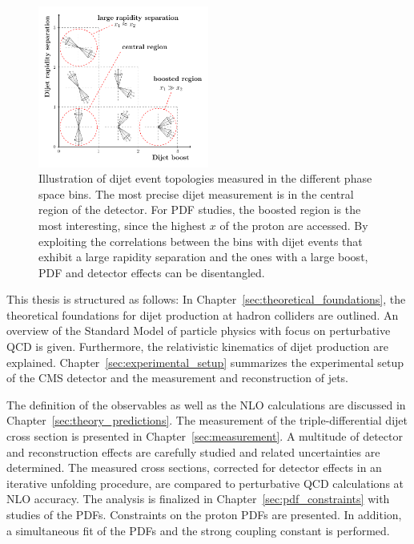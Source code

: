 \begin{figure}
    \centering
    \caption[Illustration of dijet topologies in the various \ystar and \yboost bins]{
             Illustration of dijet event topologies measured in the different
             phase space bins. The most precise dijet measurement is in the
             central region of the detector. For PDF studies, the boosted region
             is the most interesting, since the highest $x$ of the proton are
             accessed. By exploiting the correlations between the bins with
             dijet events that exhibit a large rapidity separation and the ones
             with a large
             boost, PDF and detector effects can be disentangled.}
    \label{fig:intro_ybys_hint}
    \includegraphics[width=0.5\textwidth]{figures/drawings/ybys_hint.pdf}
\end{figure}

\vspace{-10pt}
This thesis is structured as follows: In
Chapter~\ref{sec:theoretical_foundations}, the theoretical foundations for dijet
production at hadron colliders are outlined. An overview of the Standard Model
of particle physics with focus on perturbative QCD is given. Furthermore, the
relativistic kinematics of dijet production are explained.
Chapter~\ref{sec:experimental_setup} summarizes the experimental setup of the
CMS detector and the measurement and reconstruction of jets. 

The definition of the observables as well as the NLO calculations are discussed
in Chapter~\ref{sec:theory_predictions}. The measurement of the
triple-differential dijet cross section is presented in
Chapter~\ref{sec:measurement}. A multitude of detector and reconstruction
effects are carefully studied and related uncertainties are determined. The
measured cross sections, corrected for detector effects in an iterative
unfolding procedure, are compared to perturbative QCD calculations at NLO
accuracy. The analysis is finalized in Chapter~\ref{sec:pdf_constraints} with
studies of the PDFs. Constraints on the proton PDFs are presented. In addition,
a simultaneous fit of the PDFs and the strong coupling constant is performed.

